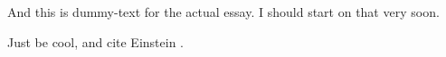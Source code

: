 And this is dummy-text for the actual essay. I should start on that very soon.

Just be cool, and cite Einstein \cite{Einstein:1915ca}.